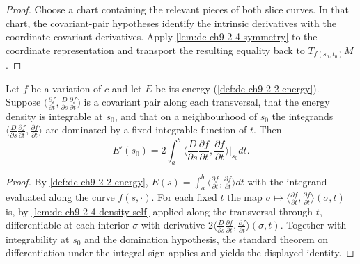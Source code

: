 \begin{proof}

  \sketch
  Choose a chart containing the relevant pieces of both slice curves. In that chart,
  the covariant-pair hypotheses identify the intrinsic derivatives with the coordinate
  covariant derivatives. Apply \cref{lem:dc-ch9-2-4-symmetry} to the coordinate
  representation and transport the resulting equality back to $T_{f(s_0,t_0)}M$.

\end{proof}
\begin{lemma}
  \label{lem:dc-ch9-2-4-under-integral}


  Let $f$ be a variation of $c$ and let $E$ be its energy (\cref{def:dc-ch9-2-2-energy}).
  Suppose $\big(\frac{\partial f}{\partial t},\frac{D}{\partial s}\frac{\partial f}{\partial t}\big)$
  is a covariant pair along each transversal, that the energy density is integrable at
  $s_0$, and that on a neighbourhood of $s_0$ the integrands
  $\big\langle\frac{D}{\partial s}\frac{\partial f}{\partial t},\frac{\partial f}{\partial t}\big\rangle$
  are dominated by a fixed integrable function of $t$. Then
  $$
  E'(s_0)
    = 2\int_a^b\Big\langle\frac{D}{\partial s}\frac{\partial f}{\partial t},\frac{\partial f}{\partial t}\Big\rangle\Big|_{s_0} dt .
  $$

\end{lemma}
\begin{proof}

  \sketch
  By \cref{def:dc-ch9-2-2-energy}, $E(s)=\int_a^b\langle\frac{\partial f}{\partial t},\frac{\partial f}{\partial t}\rangle dt$
  with the integrand evaluated along the curve $f(s,\cdot)$. For each fixed $t$ the map
  $\sigma\mapsto\langle\frac{\partial f}{\partial t},\frac{\partial f}{\partial t}\rangle(\sigma,t)$
  is, by \cref{lem:dc-ch9-2-4-density-self} applied along the transversal through $t$,
  differentiable at each interior $\sigma$ with derivative
  $2\langle\frac{D}{\partial s}\frac{\partial f}{\partial t},\frac{\partial f}{\partial t}\rangle(\sigma,t)$.
  Together with integrability at $s_0$ and the domination hypothesis, the standard theorem
  on differentiation under the integral sign applies and yields the displayed identity.

\end{proof}
